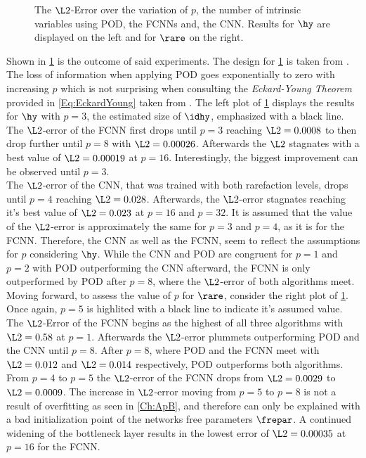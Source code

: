\begin{figure}[htbp!]
	
	\caption{The $\L2$-Error over the variation of \(p\), the number of intrinsic variables using POD, the FCNNs and, the CNN. Results for $\hy$ are displayed on the left and for $\rare$ on the right.}
	\label{Fig:IntVar}
\end{figure}
Shown in \cref{Fig:IntVar} is the outcome of said experiments. The design for \cref{Fig:IntVar} is taken from \cite{Carlberg}. The loss of information when applying POD goes exponentially to zero with increasing $p$ which is not surprising when consulting the \textit{Eckard-Young Theorem} provided in \cref{Eq:EckardYoung} taken from \cite{Kutz}.
The left plot of \cref{Fig:IntVar} displays the results for $\hy$ with $p=3$, the estimated size of \(\idhy\), emphasized with a black line. The \(\L2\)-error of the FCNN first drops until $p = 3$ reaching \(\L2 = 0.0008\) to then drop further until \(p=8\) with \(\L2=0.00026\). Afterwards the \(\L2\) stagnates with a best value of \(\L2=0.00019\) at \(p=16\). Interestingly, the biggest improvement can be observed until \(p=3\).\\
The \(\L2\)-error of the CNN, that was trained with both rarefaction levels, drops until \(p=4\) reaching \(\L2=0.028\). Afterwards, the \(\L2\)-error stagnates reaching it's best value of \(\L2=0.023\) at \(p=16\) and \(p=32\). It is assumed that the value of the \(\L2\)-error is approximately the same for \(p=3\) and \(p=4\), as it is for the FCNN. Therefore, the CNN as well as the FCNN, seem to reflect the assumptions for \(p\) considering \(\hy\). While the CNN and POD are congruent for \(p=1\) and \(p=2\) with POD outperforming the CNN afterward, the FCNN is only outperformed by POD after \(p=8\), where the \(\L2\)-error of both algorithms meet.\\ 
Moving forward, to assess the value of \(p\) for $\rare$, consider the right plot of \cref{Fig:IntVar}. Once again, \(p=5\) is highlited with a black line to indicate it's assumed value. The $\L2$-Error of the FCNN begins as the highest of all three algorithms with \(\L2=0.58\) at \(p=1\). Afterwards the \(\L2\)-error plummets outperforming POD and the CNN until \(p=8\). After \(p=8\), where POD and the FCNN meet with \(\L2=0.012\) and \(\L2=0.014\) respectively, POD outperforms both algorithms. From \(p=4\) to \(p=5\) the \(\L2\)-error of the FCNN drops from \(\L2=0.0029\) to \(\L2=0.0009\). The increase in \(\L2\)-error moving from $p=5$ to $p=8$ is not a result of overfitting as seen in \cref{Ch:ApB}, and therefore can only be explained with a bad initialization point of the networks free parameters $\frepar$. A continued widening of the bottleneck layer results in the lowest error of \(\L2=0.00035\) at \(p=16\) for the FCNN.\\
